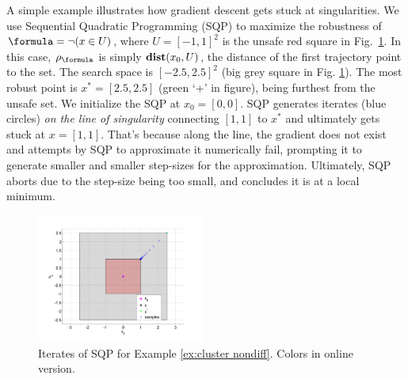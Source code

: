 \begin{exmp}
	\label{ex:cluster nondiff}
	A simple example illustrates how gradient descent gets stuck at singularities.
	We use Sequential Quadratic Programming (SQP) \cite{Polak97_Optim} to maximize the robustness of $\formula = \neg (x \in U)$, where $U=[-1,1]^2$ is the unsafe red square in Fig.~\ref{fig:DumbExample}.
	In this case, $\robf$ is simply $\mathbf{dist}(x_0,U)$, the distance of the first trajectory point to the set.
	The search space is $[-2.5,2.5]^2$ (big grey square in Fig. \ref{fig:DumbExample}). 
	The most robust point is $x^* = [2.5,2.5]$ (green `+' in figure), being furthest from the unsafe set.
	We initialize the SQP at $x_0=[0,0]$. 
	SQP generates iterates (blue circles) \textit{on the line of singularity} connecting $[1,1]$ to $x^*$ and ultimately gets stuck at $x=[1,1]$.
	That's because along the line, the gradient does not exist and attempts by SQP to approximate it numerically fail, prompting it to generate smaller and smaller step-sizes for the approximation.
	Ultimately, SQP aborts due to the step-size being too small, and concludes it is at a local minimum.
\begin{figure}[t]
\centering
\includegraphics[width=0.49\textwidth]{figures/DumbOptEx}
\caption{Iterates of SQP for Example \ref{ex:cluster nondiff}. Colors in online version.}
\label{fig:DumbExample}
\end{figure}

\end{exmp}
